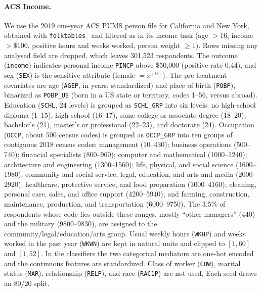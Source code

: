 \paragraph{ACS Income.}
We use the 2019 one-year ACS PUMS person file for California and New York,
obtained with \texttt{folktables}~\citep{ding2021retiring} and filtered as in
its income task (age $>16$, income $>\$100$, positive hours and weeks
worked, person weight $\ge1$). Rows missing any analysed field are dropped,
which leaves 301{,}523 respondents. The outcome (\texttt{income}) indicates
personal income \texttt{PINCP} above \$50{,}000 (positive rate 0.44), and sex
(\texttt{SEX}) is the sensitive attribute (female $=x^{(0)}$). The
pre-treatment covariates are age (\texttt{AGEP}, in years, standardized) and
place of birth (\texttt{POBP}), binarized as \texttt{POBP\_US} (born in a US
state or territory, codes 1--56, versus abroad). Education (\texttt{SCHL}, 24
levels) is grouped as \texttt{SCHL\_GRP} into six levels: no high-school
diploma (1--15), high school (16--17), some college or associate degree
(18--20), bachelor's (21), master's or professional (22--23), and doctorate
(24). Occupation (\texttt{OCCP}, about 500 census codes) is grouped as
\texttt{OCCP\_GRP} into ten groups of contiguous 2018 census codes:
management (10--430); business operations (500--740); financial specialists
(800--960); computer and mathematical (1000--1240); architecture and
engineering (1300--1560); life, physical, and social science (1600--1980);
community and social service, legal, education, and arts and media
(2000--2920); healthcare, protective service, and food preparation
(3000--4160); cleaning, personal care, sales, and office support
(4200--5940); and farming, construction, maintenance, production, and
transportation (6000--9750). The 3.5\% of respondents whose code lies outside
these ranges, mostly ``other managers'' (440) and the military (9800--9830),
are assigned to the community/legal/education/arts group. Usual weekly hours
(\texttt{WKHP}) and weeks worked in the past year (\texttt{WKWN}) are kept
in natural units and clipped to $[1,60]$ and $[1,52]$. In the classifiers the
two categorical mediators are one-hot encoded and the continuous features are
standardized. Class of worker (\texttt{COW}), marital status
(\texttt{MAR}), relationship (\texttt{RELP}), and race (\texttt{RAC1P}) are
not used. Each seed draws an 80/20 split.


